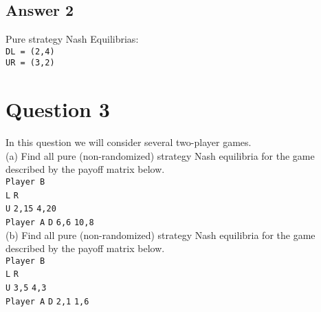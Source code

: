 \documentclass[twoside]{article}
\begin{document}
\subsection{Answer 2}

Pure strategy Nash Equilibrias: \\
\texttt{DL = (2,4)}\\
\texttt{UR = (3,2)}

\section{Question 3}
In this question we will consider several two-player games.\\

(a) Find all pure (non-randomized) strategy Nash equilibria for the game described by the payoff matrix below.\\

\hspace*{40mm}\texttt{Player B }\\
\hspace*{40mm}\texttt{L} \hspace*{15mm}\texttt{R}\\
\hspace*{24mm}\texttt{U} \hspace{11mm}\texttt{2,15} \hspace{11mm}\texttt{4,20}\\
\texttt{Player A} \hspace*{8mm}\texttt{D} \hspace{11mm}\texttt{6,6} \hspace{12mm}\texttt{10,8}\\

(b) Find all pure (non-randomized) strategy Nash equilibria for the game described by the payoff matrix below.\\

\hspace*{40mm}\texttt{Player B }\\
\hspace*{40mm}\texttt{L} \hspace*{15mm}\texttt{R}\\
\hspace*{24mm}\texttt{U} \hspace{12mm}\texttt{3,5} \hspace{12mm}\texttt{4,3}\\
\texttt{Player A} \hspace*{8mm}\texttt{D} \hspace{12mm}\texttt{2,1} \hspace{12mm}\texttt{1,6}\\
\end{document}
